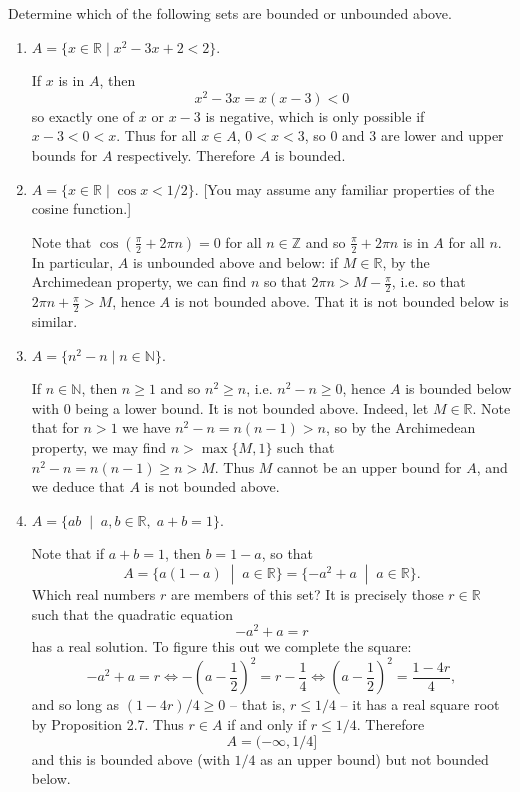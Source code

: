 \documentclass[11pt,dvipsnames]{book}
\def\R{\mathbb{R}}
\numberwithin{figure}{section} %
\numberwithin{table}{section} %
\begin{document}
\begin{exercise}
Determine which of the following sets are bounded or unbounded above.
\begin{enumerate}[label=(\alph*)]
\item $A=\{x \in \R\; | \; x^2-3x+2<2\}$.
\begin{solution}
If $x$ is in $A$, then
\[
x^2-3x=x(x-3)<0
\]
so exactly one of $x$ or $x-3$ is negative, which is only possible if $x-3< 0< x$. Thus for all $x \in A$, $0<x<3$, so $0$ and $3$ are lower and upper bounds for $A$ respectively. Therefore $A$ is bounded.
\end{solution}
\item $A= \{x \in \R \; | \; \cos x<1/2\}$. [You may assume any familiar properties of the cosine function.]
\begin{solution}
Note that $\cos \left(\frac{\pi}{2}+2\pi n\right)=0$ for all $n\in\mathbb{Z}$ and so $\frac{\pi}{2}+2\pi n$ is in $A$ for all $n$. In particular, $A$ is unbounded above and below: if $M\in\mathbb{R}$, by the Archimedean property, we can find $n$  so that $2\pi n>M-\frac{\pi}{2}$, i.e. so that $2\pi n+\frac{\pi}{2}>M$, hence $A$ is not bounded above. That it is not bounded below is similar.
\end{solution}
\item $A = \{n^2-n \; | \; n\in\mathbb{N}\}$.
\begin{solution}
If $n\in\mathbb{N}$, then $n\geq 1$ and so $n^2\geq n$, i.e. $n^2-n \geq 0$, hence $A$ is bounded below with $0$ being a lower bound. It is not bounded above. Indeed, let $M \in \R$. Note that for $n > 1$ we have $n^2-n=n(n-1)> n$, so by the Archimedean property, we may find $n>\max\{M,1\}$ such that $n^2-n=n(n-1)\geq n>M$. Thus $M$ cannot be an upper bound for $A$, and we deduce that $A$ is not bounded above.
\end{solution}
\item $A=\{ab \;\;| \;\;  a, b \in \R, \; a+b=1\}$.
\begin{solution}
Note that if $a+b=1$, then $b=1-a$, so that
\[
A = \{a(1-a)\;\; |\;\;a\in\mathbb{R}\} = \{- a^2 +a \;\; |\;\;a\in\mathbb{R}\}.
\]
Which real numbers $r$ are members of this set? It is precisely those $r \in \R$ such that the quadratic equation
\[
-a^2 + a =r
\]
has a real solution. To figure this out we complete the square:
\[
-a^2 + a =r \iff -\left(a-\frac{1}{2}\right)^2 = r -\frac{1}{4} \iff \left(a-\frac{1}{2}\right)^2 =\frac{1-4r}{4},
\]
and so long as $(1-4r)/4 \geq 0$ -- that is, $r \leq 1/4$ --  it has a real square root by Proposition 2.7. Thus $r \in A$ if and only if $r \leq 1/4$. Therefore
\[
A = (- \infty, 1/4]
\]
and this is bounded above (with $1/4$ as an upper bound) but not bounded below.

\end{solution}
\end{enumerate}

\end{exercise}
\end{document}

